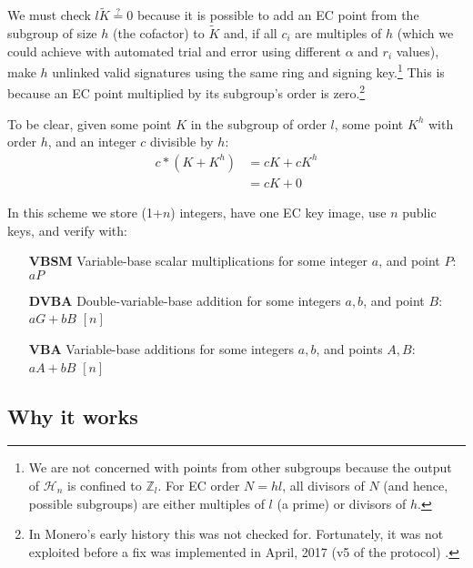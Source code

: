 We must check $l \tilde{K} \stackrel{?}{=} 0$ because it is possible to add an EC point from the subgroup of size $h$ (the cofactor) to $\tilde{K}$ and, if all $c_i$ are multiples of $h$ (which we could achieve with automated trial and error using different $\alpha$ and $r_i$ values), make $h$ unlinked valid signatures using the same ring and signing key.\footnote{We are not concerned with points from other subgroups because the output of $\mathcal{H}_n$ is confined to $\mathbb{Z}_l$. For EC order $N = h l$, all divisors of $N$ (and hence, possible subgroups) are either multiples of $l$ (a prime) or divisors of $h$.} This is because an EC point multiplied by its subgroup's order is zero.\footnote{In Monero's early history this was not checked for. Fortunately, it was not exploited before a fix was implemented in April, 2017 (v5 of the protocol) \cite{key-image-bug} .}

To be clear, given some point $K$ in the subgroup of order $l$, some point $K^h$ with order $h$, and an integer $c$ divisible by $h$:
\begin{align*}
    c*(K + K^h) &= cK + cK^h \\
                &= cK + 0
\end{align*}

In this scheme we store (1+$n$) integers, have one EC key image, use $n$ public keys, and verify with:

\begin{itemize}
    \setlength\itemsep{\listspace}
    \item [\textbf{VBSM}] Variable-base scalar multiplications for some integer $a$, and point $P$: $a P$ \quad [1]
    \item [\textbf{DVBA}] Double-variable-base addition for some integers $a, b$, and point $B$: $a G + b B$ \quad \([n]\)
    \item [\textbf{VBA}] Variable-base additions for some integers $a, b$, and points $A, B$: $a A + b B$ \quad \([n]\)
\end{itemize}



\subsection*{Why it works}

